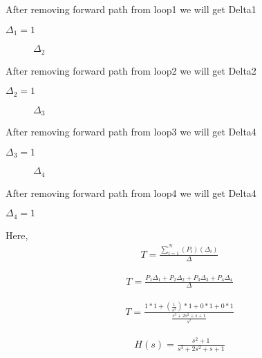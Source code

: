 \begin{enumerate}[label=\thesection.\arabic*.,ref=\thesection.\theenumi]
After removing forward path from loop1 we will get Delta1

$\Delta_1 = 1$

\begin{figure}[!ht]
\begin{center}
		
		\resizebox{\columnwidth}{!}{}
	\end{center}
\caption{$\Delta_2$}
\label{fig:sec_order}
\end{figure}

After removing forward path from loop2 we will get Delta2

$\Delta_2 = 1$

\begin{figure}[!ht]
\begin{center}
		
		\resizebox{\columnwidth}{!}{}
	\end{center}
\caption{$\Delta_3$}
\label{fig:sec_order}
\end{figure}

After removing forward path from loop3 we will get Delta4

$\Delta_3 = 1$

\begin{figure}[!ht]
\begin{center}
		
		\resizebox{\columnwidth}{!}{}
	\end{center}
\caption{$\Delta_4$}
\label{fig:sec_order}
\end{figure}

After removing forward path from loop4 we will get Delta4

$\Delta_4 = 1$

Here, 
\begin{align}
T=\frac{\sum_{i=1}^{N}(P_i)(\Delta_i)}{\Delta}
\end{align}

\begin{align}
T=\frac{P_1 \Delta_1+P_2 \Delta_2+P_3 \Delta_3+P_4 \Delta_4}{\Delta}
\end{align}

\begin{align}
T=\frac{1*1 +(\frac{1}{s^2})*1 + 0*1 + 0*1 }{\frac{s^3+2s^2+s+1}{s^2}}
\end{align}

\begin{align}
H(s)=\frac{s^2+1}{s^3+2s^2+s+1}
\end{align}
\renewcommand{\thefigure}{\theenumi}

\end{enumerate}
